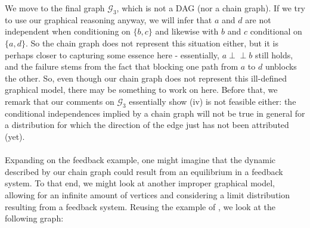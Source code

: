 \documentclass[11pt, a4paper]{memoir}
\theoremstyle{break}
\theoremstyle{break}
\theoremstyle{nonumberplain}
\newcommand{\indep}{\perp \!\!\! \perp}
\begin{document}
We move to the final graph $\mathcal{G}_3$, which is not a DAG (nor a chain graph). If we try to use our graphical reasoning anyway, we will infer that $a$ and $d$ are not independent when conditioning on $\{b,c\}$ and likewise with $b$ and $c$ conditional on $\{a,d\}$. So the chain graph does not represent this situation either, but it is perhaps closer to capturing some essence here - essentially, $a\indep b$ still holds, and the failure stems from the fact that blocking one path from $a$ to $d$ unblocks the other. So, even though our chain graph does not represent this ill-defined graphical model, there may be something to work on here. Before that, we remark that our comments on $\mathcal{G}_3$ essentially show (iv) is not feasible either: the conditional independences implied by a chain graph will not be true in general for a distribution for which the direction of the edge just has not been attributed (yet).\\\\
Expanding on the feedback example, one might imagine that the dynamic described by our chain graph could result from an equilibrium in a feedback system. To that end, we might look at another improper graphical model, allowing for an infinite amount of vertices and considering a limit distribution resulting from a feedback system. Reusing the example of \cite{ChainGraph}, we look at the following graph:
\begin{figure}[H]
  \centering
\end{figure}
\end{document}
